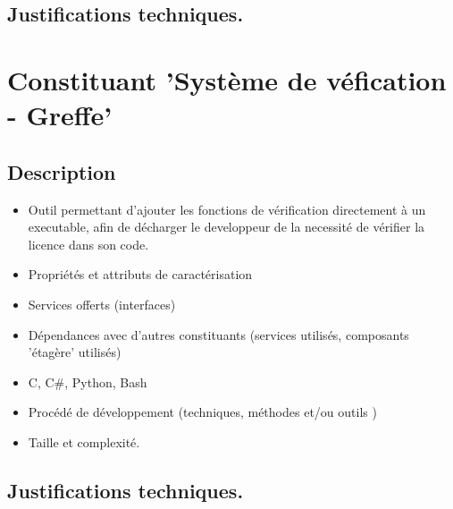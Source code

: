 \subsection{Justifications techniques.}

\section{Constituant 'Système de véfication - Greffe'}
\subsection{Description}
\begin{itemize}
	\item Outil permettant d'ajouter les fonctions de vérification directement à un
				executable, afin de décharger le developpeur de la necessité de vérifier 
				la licence dans son code.
	\item Propriétés et attributs de caractérisation
	\item Services offerts (interfaces)
	\item Dépendances avec d’autres constituants (services utilisés, composants 'étagère' utilisés)
	\item C, C\#, Python, Bash 
	\item Procédé de développement (techniques, méthodes et/ou outils )
	\item Taille et complexité.
\end{itemize}
\subsection{Justifications techniques.}

